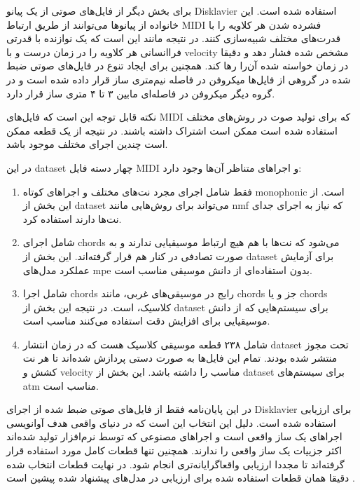 برای بخش دیگر از فایل‌های صوتی از یک پیانو Disklavier استفاده شده است. این
خانواده از پیانوها می‌توانند از طریق ارتباط \gls{MIDI} فشرده شدن هر کلاویه را با
قدرت‌های مختلف شبیه‌سازی کنند. در نتیجه مانند این است که یک نوازنده با قدرتی
فراانسانی هر کلاویه را در زمان درست و با \gls{velocity} مشخص شده فشار دهد و
دقیقا در زمان خواسته شده آن‌را رها کند. همچنین برای ایجاد تنوع در فایل‌های صوتی
ضبط شده در گروهی از فایل‌ها میکروفن در فاصله نیم‌متری ساز قرار داده شده است و در
گروه دیگر میکروفن در فاصله‌ای مابین ۳ تا ۴ متری ساز قرار دارد.

نکته قابل توجه این است که فایل‌های \gls{MIDI} که برای تولید صوت در روش‌های مختلف
استفاده شده است ممکن است اشتراک داشته باشند. در نتیجه از یک قطعه ممکن است چندین
اجرای مختلف موجود باشد.

در این \gls{dataset} چهار دسته فایل \gls{MIDI} و اجراهای متناظر آن‌ها وجود دارد:
\begin{enumerate}
    \item فقط شامل اجرای مجرد نت‌های مختلف و اجراهای کوتاه
    \gls{monophonic} است. از این بخش از \gls{dataset} می‌تواند برای روش‌هایی
    مانند \gls{nmf} که نیاز به اجرای جدای نت‌ها دارند استفاده کرد.

    \item  شامل اجرای \glspl{chord} می‌شود که نت‌ها با هم هیچ ارتباط
    موسیقیایی ندارند و به صورت تصادفی در کنار هم قرار گرفته‌اند. این بخش از
    \gls{dataset} برای آزمایش عملکرد مدل‌های \gls{mpe} بدون استفاده‌ای از دانش
    موسیقی مناسب است.

    \item شامل اجرا \glspl{chord} رایج در موسیقی‌های غربی، مانند \glspl{chord}
    جز و یا \glspl{chord} کلاسیک، است. در نتیجه این بخش از \gls{dataset} برای
    سیستم‌هایی که از دانش موسیقیایی برای افزایش  دقت استفاده می‌کنند مناسب است.

    \item شامل ۲۳۸ قطعه موسیقی کلاسیک هست که در زمان انتشار \gls{dataset} تحت
    مجوز  منتشر شده بودند. تمام این فایل‌ها به صورت دستی
    پردازش شده‌اند تا هر نت کشش و \gls{velocity} مناسب را داشته باشد. این بخش از
    \gls{dataset} برای سیستم‌های \gls{atm} مناسب است.
\end{enumerate}

در این پایان‌نامه فقط از فایل‌های صوتی ضبط شده از اجرای Disklavier برای ارزیابی
استفاده شده است. دلیل این انتخاب این است که در دنیای واقعی هدف آوانویسی اجراهای
یک ساز واقعی است و اجراهای مصنوعی که توسط نرم‌افزار تولید شده‌اند اکثر جزییات یک
ساز واقعی را ندارند. همچنین تنها قطعات کامل مورد استفاده قرار گرفته‌اند تا مجددا
ارزیابی واقعاگرایانه‌تری انجام شود. در نهایت قطعات انتخاب شده دقیقا همان قطعات
استفاده شده برای ارزیابی در مدل‌های پیشنهاد شده پیشین است
\cite{hawthorne2017onsets,hawthorne2018enabling}.

